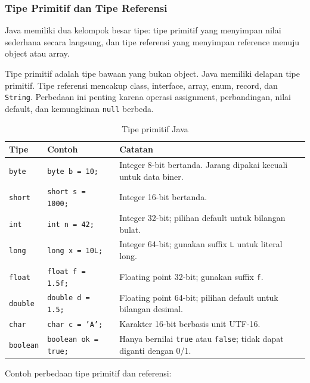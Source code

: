 \subsubsection{Tipe Primitif dan Tipe Referensi}

\begin{jawab}
Java memiliki dua kelompok besar tipe: tipe primitif yang menyimpan nilai sederhana secara langsung, dan tipe referensi yang menyimpan reference menuju object atau array.
\end{jawab}

Tipe primitif adalah tipe bawaan yang bukan object. Java memiliki delapan tipe primitif. Tipe referensi mencakup class, interface, array, enum, record, dan \texttt{String}. Perbedaan ini penting karena operasi assignment, perbandingan, nilai default, dan kemungkinan \texttt{null} berbeda.

\begin{table}[H]
\centering
\begin{tabularx}{\textwidth}{|L{0.18\textwidth}|L{0.20\textwidth}|X|}
\hline
\textbf{Tipe} & \textbf{Contoh} & \textbf{Catatan} \\
\hline
\texttt{byte} & \texttt{byte b = 10;} & Integer 8-bit bertanda. Jarang dipakai kecuali untuk data biner. \\
\hline
\texttt{short} & \texttt{short s = 1000;} & Integer 16-bit bertanda. \\
\hline
\texttt{int} & \texttt{int n = 42;} & Integer 32-bit; pilihan default untuk bilangan bulat. \\
\hline
\texttt{long} & \texttt{long x = 10L;} & Integer 64-bit; gunakan suffix \texttt{L} untuk literal long. \\
\hline
\texttt{float} & \texttt{float f = 1.5f;} & Floating point 32-bit; gunakan suffix \texttt{f}. \\
\hline
\texttt{double} & \texttt{double d = 1.5;} & Floating point 64-bit; pilihan default untuk bilangan desimal. \\
\hline
\texttt{char} & \texttt{char c = 'A';} & Karakter 16-bit berbasis unit UTF-16. \\
\hline
\texttt{boolean} & \texttt{boolean ok = true;} & Hanya bernilai \texttt{true} atau \texttt{false}; tidak dapat diganti dengan 0/1. \\
\hline
\end{tabularx}
\caption{Tipe primitif Java}
\label{tab:tipe-primitif-java}
\end{table}

Contoh perbedaan tipe primitif dan referensi:

